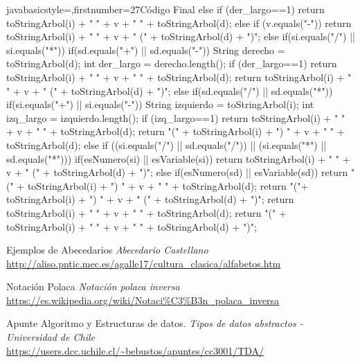 \documentclass[letterpaper,11pt]{article} %
\begin{document}
\begin{sourcecodep}[\label{Codigo Final}]{java}{basicstyle={\fontsize{7}{10}\selectfont\ttfamily},firstnumber=27}{Código Final}
{{{{{					else if (der_largo==1) return toStringArbol(i) + " " + v + " " + toStringArbol(d);
					else if (v.equals("-")) return toStringArbol(i) + " " + v + " (" + toStringArbol(d) + ")";
				}
				else if(si.equals("/") || si.equals("*")){
					if(sd.equals("+") || sd.equals("-")){
						String derecho = toStringArbol(d);
						int der_largo = derecho.length();
						if (der_largo==1) return toStringArbol(i) + " " + v + " " + toStringArbol(d);
						return toStringArbol(i) + " " + v + " (" + toStringArbol(d) + ")";
					}
				}
				else if(sd.equals("/") || sd.equals("*")){
					if(si.equals("+") || si.equals("-")){
						String izquierdo = toStringArbol(i);
						int izq_largo = izquierdo.length();
						if (izq_largo==1) return toStringArbol(i) + " " + v + " " + toStringArbol(d);
						return "(" + toStringArbol(i) + ") " + v + " " + toStringArbol(d);
					}
				}
			}
			else if ((si.equals("/") || sd.equals("/")) || (si.equals("*") || sd.equals("*"))){
				if(esNumero(si) || esVariable(si)) return toStringArbol(i) + " " + v + " (" + toStringArbol(d) + ")";
				else if(esNumero(sd) || esVariable(sd)) return "(" + toStringArbol(i) + ") " + v + " " + toStringArbol(d);
				return "("+ toStringArbol(i) + ") " + v + " (" + toStringArbol(d) + ")"; 
			}
			return toStringArbol(i) + " " + v + " " + toStringArbol(d);
		}
		return "(" + toStringArbol(i) + " " + v + " " + toStringArbol(d) + ")";
	}
}
\end{sourcecodep}



\newpage
\begin{references}
	Ejemplos de Abecedarios
	\textit{Abecedario Castellano} \\
	\url{http://aliso.pntic.mec.es/agalle17/cultura_clasica/alfabetos.htm}

	Notación Polaca
	\textit{Notación polaca inversa} \\
	\url{https://es.wikipedia.org/wiki/Notaci%C3%B3n_polaca_inversa}

	Apunte Algoritmo y Estructuras de datos. 
	\textit{Tipos de datos abstractos - Universidad de Chile} \\
	\url{https://users.dcc.uchile.cl/~bebustos/apuntes/cc3001/TDA/}

\end{references}

\end{document}
